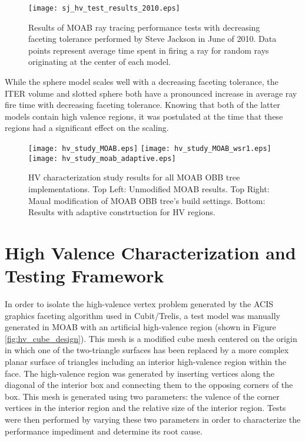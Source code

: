 \begin{figure}[H]
  \centering
  \begin{center}
    \texttt{[image: sj\_hv\_test\_results\_2010.eps]} \\
    \caption{Results of MOAB ray tracing performance tests with decreasing
      faceting tolerance performed by Steve Jackson in June of 2010. Data points
      represent average time spent in firing a ray for random rays
      originating at the center of each model.}
    \label{fig:sj_hv_test_results}
  \end{center}
\end{figure}

While the sphere model scales well with a decreasing faceting tolerance, the
ITER volume and slotted sphere both have a pronounced increase in average ray
fire time with decreasing faceting tolerance. Knowing that both of the latter
models contain high valence regions, it was postulated at the time that these
regions had a significant effect on the scaling.

\begin{sidewaysfigure}
  \centering
  \texttt{[image: hv\_study\_MOAB.eps]}
  \texttt{[image: hv\_study\_MOAB\_wsr1.eps]}
  \texttt{[image: hv\_study\_moab\_adaptive.eps]}
  \caption{HV characterization study results for all MOAB OBB tree
    implementations. Top Left: Unmodified MOAB results. Top Right: Maual
    modification of MOAB OBB tree's build settings. Bottom: Results with
    adaptive constrtuction for HV regions.}
  \label{fig:moab_hv_studies}
\end{sidewaysfigure}

\section{High Valence Characterization and Testing Framework}

In order to isolate the high-valence vertex problem generated by the ACIS
graphics faceting algorithm used in Cubit/Trelis, a test model was manually
generated in MOAB with an artificial high-valence region (shown in Figure
\ref{fig:hv_cube_design}). This mesh is a modified cube mesh centered on the
origin in which one of the two-triangle surfaces has been replaced by a more
complex planar surface of triangles including an interior high-valence region
within the face. The high-valence region was generated by inserting vertices
along the diagonal of the interior box and connecting them to the opposing
corners of the box. This mesh is generated using two parameters: the valence of
the corner vertices in the interior region and the relative size of the interior
region. Tests were then performed by varying these two parameters in order to
characterize the performance impediment and determine its root cause.

